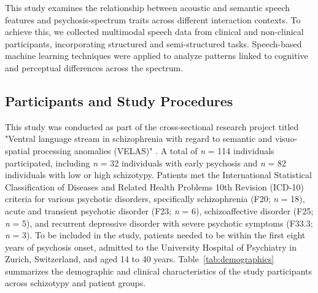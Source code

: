 \documentclass[9pt,a4paper]{rho-class/rho}
\begin{document}
This study examines the relationship between acoustic and semantic speech features and psychosis-spectrum traits across different interaction contexts. To achieve this, we collected multimodal speech data from clinical and non-clinical participants, incorporating structured and semi-structured tasks. Speech-based machine learning techniques were applied to analyze patterns linked to cognitive and perceptual differences across the spectrum.

\subsection{Participants and Study Procedures}

This study was conducted as part of the cross-sectional research project titled "Ventral language stream in schizophrenia with regard to semantic and visuo-spatial processing anomalies (VELAS)" \cite{Sarti2025}. A total of \textit{n} = 114 individuals participated, including \textit{n} = 32 individuals with early psychosis and \textit{n} = 82 individuals with low or high schizotypy. Patients met the International Statistical Classification of Diseases and Related Health Problems 10th Revision (ICD-10) criteria for various psychotic disorders, specifically schizophrenia (F20; \textit{n} = 18), acute and transient psychotic disorder (F23; \textit{n} = 6), schizoaffective disorder (F25; \textit{n} = 5), and recurrent depressive disorder with severe psychotic symptoms (F33.3; \textit{n} = 3). To be included in the study, patients needed to be within the first eight years of psychosis onset, admitted to the University Hospital of Psychiatry in Zurich, Switzerland, and aged 14 to 40 years. Table~\ref{tab:demographics} summarizes the demographic and clinical characteristics of the study participants across schizotypy and patient groups.
\end{document}
